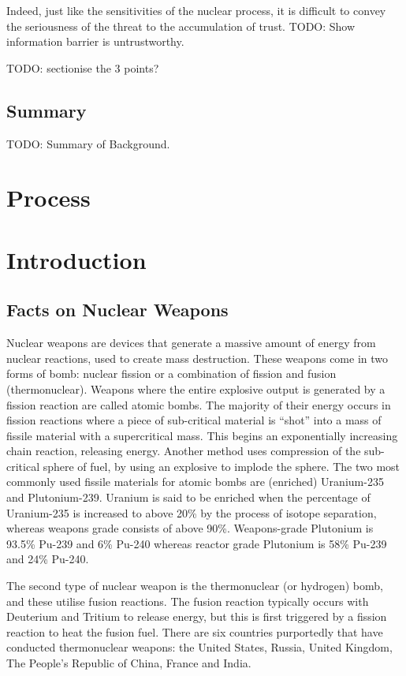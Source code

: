 \documentclass[twoside,titlepage,11pt,twocolumn,a4paper]{article}
\begin{document}
Indeed, just like the sensitivities of the nuclear process, it is
difficult to convey the seriousness of the threat to the accumulation
of trust. TODO: Show information barrier is untrustworthy.

TODO: sectionise the 3 points?
\subsection{Summary}
TODO: Summary of Background.

\section{Process}

\section{Introduction}

\subsection{Facts on Nuclear Weapons}
Nuclear weapons are devices that generate a massive amount of energy
from nuclear reactions, used to create mass destruction. These weapons
come in two forms of bomb: nuclear fission or a combination of fission
and fusion (thermonuclear). Weapons where the entire explosive output
is generated by a fission reaction are called atomic bombs. The
majority of their energy occurs in fission reactions where a piece of
sub-critical material is ``shot'' into a mass of fissile material with
a supercritical mass. This begins an exponentially increasing chain
reaction, releasing energy. Another method uses compression of the
sub-critical sphere of fuel, by using an explosive to implode the
sphere. The two most commonly used fissile materials for atomic bombs
are (enriched) Uranium-235 and Plutonium-239. Uranium is said to be
enriched when the percentage of Uranium-235 is increased to above 20\%
by the process of isotope separation, whereas weapons grade consists
of above 90\%. \citep{blackmarket} Weapons-grade Plutonium is 93.5\%
Pu-239 and 6\% Pu-240 whereas reactor grade Plutonium is 58\% Pu-239
and 24\% Pu-240.  \citep{drell1993}

The second type of nuclear weapon is the thermonuclear (or hydrogen)
bomb, and these utilise fusion reactions.  The fusion reaction
typically occurs with Deuterium and Tritium to release energy, but
this is first triggered by a fission reaction to heat the fusion
fuel. There are six countries purportedly that have conducted
thermonuclear weapons: the United States, Russia, United Kingdom, The
People's Republic of China, France and India.
\end{document}
